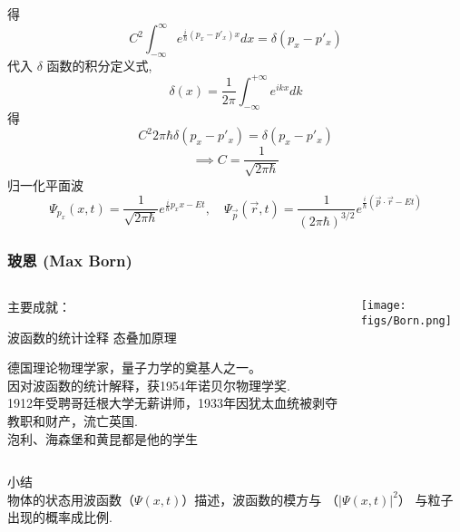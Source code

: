     \begin{frame}
        \frametitle{} 
    得
    \[C^2 \int_{-\infty} ^\infty e^{\frac{i}{\hbar}(p_x-p'_x)x} dx =\delta (p_x-p'_x)\]
     代入 $\delta$ 函数的积分定义式,
     \[ \delta(x)= \frac{1}{2 \pi} \int_{-\infty}^{+\infty}e^{i k x}d k\]
     得
     \[C^2 2\pi \hbar \delta (p_x-p'_x) =\delta(p_x-p'_x) \]
     \[\implies C= \dfrac{1}{\sqrt{2\pi \hbar}}\]
     归一化平面波
     \begin{equation*}
        \Psi_{p_x}(x,t)=\frac{1}{\sqrt{2\pi \hbar}} e^{\frac{i}{\hbar}p_x x-Et}, \quad \Psi _{\vec{p}}(\vec{r} ,t)=\frac{1}{(2\pi \hbar)^{3/2}} e^{\frac{i}{\hbar}(\vec{p}\cdot \vec{r} -Et)}
    \end{equation*}  
\end{frame}

\begin{frame}
    \frametitle{玻恩 (Max Born)}
        \begin{columns}
            \begin{column}[t]{0.46\linewidth}
                主要成就：
                \begin{enumerate}
                     \IItem 波函数的统计诠释
                     \IItem 态叠加原理
                \end{enumerate}
                德国理论物理学家，量子力学的奠基人之一。\\
                因对波函数的统计解释，获1954年诺贝尔物理学奖.\\
                1912年受聘哥廷根大学无薪讲师，1933年因犹太血统被剥夺教职和财产，流亡英国.\\ \vspace{0.3em}
                泡利、海森堡和黄昆都是他的学生
            \end{column}
            \begin{column}[t]{0.46\linewidth}
                \begin{center}
                    \texttt{[image: figs/Born.png]} \\
                \end{center} 
            \end{column}           
        \end{columns}
\end{frame}

\begin{frame}  
    \begin{atcbox}{小结}
        ~~\\
       {物体的状态用波函数（$ \Psi(x,t)$）描述，波函数的模方与 （$\left\vert\Psi(x,t) \right\vert^2$） 
       与粒子出现的概率成比例.}
    \end{atcbox} 
\end{frame} 



